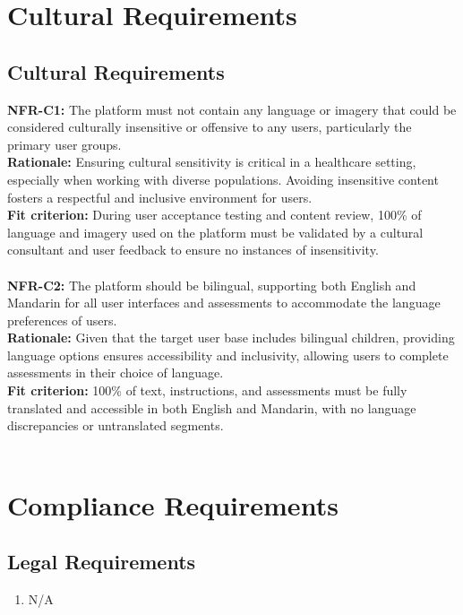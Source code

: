 \documentclass[12pt]{article}
\begin{document}
\section{Cultural Requirements}
\subsection{Cultural Requirements}
\textbf{NFR-C1: }The platform must not contain any language or imagery that could be considered culturally insensitive or offensive to any users, particularly the primary user groups.\\
\textbf{Rationale: }Ensuring cultural sensitivity is critical in a healthcare setting, especially when working with diverse populations. Avoiding insensitive content fosters a respectful and inclusive environment 
for users.\\
\textbf{Fit criterion: }During user acceptance testing and content review, 100\% of language and imagery used on the platform must be validated by a cultural consultant and user feedback to ensure no instances of 
insensitivity.\\\\
\textbf{NFR-C2: }The platform should be bilingual, supporting both English and Mandarin for all user interfaces and assessments to accommodate the language preferences of users.\\
\textbf{Rationale: }Given that the target user base includes bilingual children, providing language options ensures accessibility and inclusivity, allowing users to complete assessments in their choice of language.\\
\textbf{Fit criterion: }100\% of text, instructions, and assessments must be fully translated and accessible in both English and Mandarin, with no language discrepancies or untranslated segments.\\\\

\section{Compliance Requirements}
\subsection{Legal Requirements}
\begin{enumerate}[{CR-LR}1. ]
  \item N/A
\end{enumerate}
\end{document}
